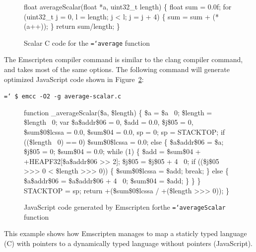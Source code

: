 \documentclass[preprint]{sigplanconf}
\newcommand{\ttt}[1]{{\texttt{\hyphenchar\font=`\-\relax #1}}}%
\begin{document}
\begin{figure}
\begin{small}
\begin{program}[style=tt, number=true]
fl\tab{}oat averageScalar(float *a, uint32\_t length) \{
  float  sum = 0.0f;
  fo\tab{}r (uint32\_t j = 0, l = length; j < l; j = j + 4) \{
    sum = sum + (*(a++));\untab{}
  \}
  return sum/length;\untab{}
\}
\end{program}
\end{small}
\caption{Scalar C code for the \ttt{average} function}
\label{fig:average-scalar}
\end{figure}

The Emscripten compiler command is similar to the clang compiler command, and
takes most of the same options.  The following command will generate optimized
JavaScript code shown in Figure~\ref{fig:average-scalar-code}:

\smallskip
\ttt{  \$ emcc -O2 -g average-scalar.c}
\smallskip

\begin{figure}
\begin{small}
\begin{program}[style=tt, number=true]
fu\tab{}nction \_averageScalar(\$a, \$length) \{
 \$a = \$a \textbar\ 0;
 \$length = \$length \textbar\ 0;
 var \tab{}\$a\$addr\$06 = 0, \$add = 0.0, \$j\$05 = 0,
     \$sum\$0\$lcssa = 0.0, \$sum\$04 = 0.0, sp = 0;\untab{}
 sp = STACKTOP;
 if\tab{} ((\$length \textbar\ 0) == 0)
   \$sum\$0\$lcssa = 0.0;\untab{}
 el\tab{}se \{
  \$a\$addr\$06 = \$a;
  \$j\$05 = 0;
  \$sum\$04 = 0.0;
  wh\tab{}ile (1) \{
   \$add = \$sum\$04 + +HEAPF32[\$a\$addr\$06 >> 2];
   \$j\$05 = \$j\$05 + 4 \textbar\ 0;
   if\tab{} (\!(\$j\$05 >>> 0 < \$length >>> 0)) \{
    \$sum\$0\$lcssa = \$add;
    break;\untab{}
   \}\tab{} else \{
    \$a\$addr\$06 = \$a\$addr\$06 + 4 \textbar\ 0;
    \$sum\$04 = \$add;\untab{}
   \}\untab{}
  \}\untab{}
 \}
 STACKTOP = sp;
 return +(\$sum\$0\$lcssa / +(\$length >>> 0));\untab{}
\}
\end{program}
\end{small}
\caption{JavaScript code generated by Emscripten for\newline the \ttt{averageScalar} function}
\label{fig:average-scalar-code}
\end{figure}

This example shows how Emscripten manages to map a staticly typed language (C) with pointers
to a dynamically typed language without pointers (JavaScript).
\end{document}
